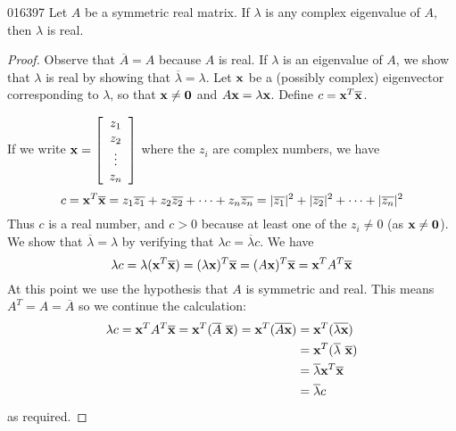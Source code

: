 \begin{theorem}{}{016397} %
Let $A$ be a symmetric real matrix. If $\lambda$ is any complex eigenvalue of $A$, then $\lambda$ is real.\footnotemark 
\end{theorem}

\begin{proof}
Observe that $\overline{A} = A$ because $A$ is real. If $\lambda$ is an eigenvalue of $A$, we show that $\lambda$ is real by showing that $\overline{\lambda} = \lambda$.
 Let $\textbf{x}$ be a (possibly complex) eigenvector corresponding to $\lambda$, so that $\textbf{x} \neq \textbf{0}$ and $A\textbf{x} = \lambda\textbf{x}$. Define $c = \textbf{x}^T\overline{\textbf{x}}$.

If we write $\textbf{x} = \left[ \begin{array}{c} 
z_1 \\
z_2 \\
\vdots \\
z_n 
\end{array}\right]$  where the $z_{i}$ are complex numbers, we have
\begin{equation*}
c = \textbf{x}^T\overline{\textbf{x}} = z_1\overline{z_1} + z_2\overline{z_2} + \dotsb + z_n\overline{z_n} = |\overline{z_1}|^2 + |\overline{z_2}|^2 + \dotsb + |\overline{z_n}|^2
\end{equation*} 
Thus $c$ is a real number, and $c > 0$ because at least one of the $z_{i} \neq 0$ (as $\textbf{x} \neq \textbf{0}$). We show that $\overline{\lambda} = \lambda$ by verifying that $\lambda c = \overline{\lambda}c$. We have
\begin{equation*}
\lambda c = \lambda(\textbf{x}^T\overline{\textbf{x}}) = (\lambda \textbf{x})^T\overline{\textbf{x}} = (A\textbf{x})^T\overline{\textbf{x}} = \textbf{x}^TA^T\overline{\textbf{x}}
\end{equation*}
At this point we use the hypothesis that $A$ is symmetric and real. This means $A^T = A = \overline{A}$ so we continue the calculation:
\newpage
\begin{align*}
\lambda c = \vect{x}^TA^T\overline{\vect{x}} = \vect{x}^T(\overline{A}\ \overline{\vect{x}}) = \vect{x}^T(\overline{A\vect{x}}) &= \vect{x}^T(\overline{\lambda \vect{x}}) \\
&= \vect{x}^T(\overline{\lambda}\ \overline{\vect{x}}) \\
&= \overline{\lambda}\vect{x}^T\overline{\vect{x}} \\
&= \overline{\lambda}c
\end{align*}
as required.
\end{proof}


